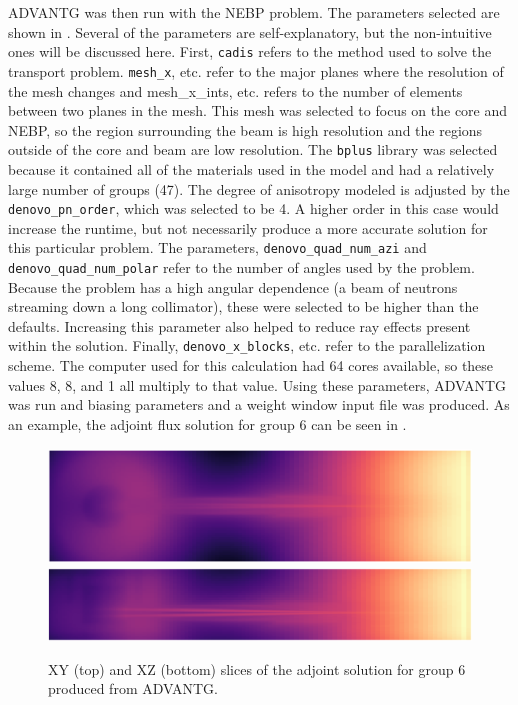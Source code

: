 ADVANTG was then run with the NEBP problem.
The parameters selected are shown in .
Several of the parameters are self-explanatory, but the non-intuitive ones will be discussed here.
First, {\tt cadis} refers to the method used to solve the transport problem.
{\tt mesh\_x}, etc. refer to the major planes where the resolution of the mesh changes and {mesh\_x\_ints}, etc. refers to the number of elements between two planes in the mesh.
This mesh was selected to focus on the core and NEBP, so the region surrounding the beam is high resolution and the regions outside of the core and beam are low resolution.
The {\tt bplus} library was selected because it contained all of the materials used in the model and had a relatively large number of groups (47).
The degree of anisotropy modeled is adjusted by the {\tt denovo\_pn\_order}, which was selected to be 4.
A higher order in this case would increase the runtime, but not necessarily produce a more accurate solution for this particular problem.
The parameters, {\tt denovo\_quad\_num\_azi} and {\tt denovo\_quad\_num\_polar} refer to the number of angles used by the problem.
Because the problem has a high angular dependence (a beam of neutrons streaming down a long collimator), these were selected to be higher than the defaults.
Increasing this parameter also helped to reduce ray effects present within the solution.
Finally, {\tt denovo\_x\_blocks}, etc. refer to the parallelization scheme.
The computer used for this calculation had 64 cores available, so these values 8, 8, and 1 all multiply to that value.
Using these parameters, ADVANTG was run and biasing parameters and a weight window input file was produced.
As an example, the adjoint flux solution for group 6 can be seen in .

\begin{figure}[htb]
\centering
\includegraphics[width=\textwidth]{tex/figures/advantgxy.png}\\
\includegraphics[width=\textwidth]{tex/figures/advantgxz.png}
\caption[ADVANTG Solution]{XY (top) and XZ (bottom) slices of the adjoint solution for group 6 produced from ADVANTG.}
\label{fig:advantg}
\end{figure}


